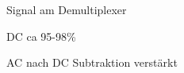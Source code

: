 \documentclass[a4paper]{article}
\begin{document}
\begin{multicols}{3}
  Signal am Demultiplexer
  \begin{itemize*}
    \item DC ca 95-98\%
    \item AC nach DC Subtraktion verstärkt
  \end{itemize*}




\end{multicols}
\end{document}
